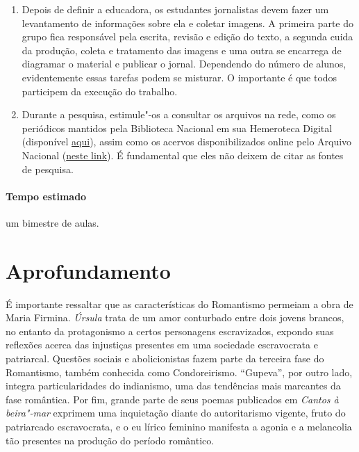 \documentclass[12pt]{extarticle}
\begin{document}
\begin{enumerate}
\item
Depois de definir a educadora, os estudantes jornalistas devem fazer
um levantamento de informações sobre ela e coletar imagens. A primeira
parte do grupo fica responsável pela escrita, revisão e edição do texto,
a segunda cuida da produção, coleta e tratamento das imagens e uma outra
se encarrega de diagramar o material e publicar o jornal. Dependendo do
número de alunos, evidentemente essas tarefas podem se misturar. O
importante é que todos participem da execução do trabalho.

\item
Durante a pesquisa, estimule"-os a consultar os arquivos na rede, como
os periódicos mantidos pela Biblioteca Nacional em sua Hemeroteca
Digital (disponível \href{https://bndigital.bn.gov.br/hemeroteca-digital/}{aqui}), assim como os acervos disponibilizados online pelo Arquivo
Nacional (\href{https://www.gov.br/arquivonacional/pt-br}{neste link}). É fundamental que eles não deixem de citar as fontes de
pesquisa.
\end{enumerate}

\paragraph{Tempo estimado} um bimestre de aulas.

\section{Aprofundamento}

É importante ressaltar que as características do Romantismo permeiam a
obra de Maria Firmina. \emph{Úrsula} trata de um amor conturbado entre
dois jovens brancos, no entanto da protagonismo a certos personagens
escravizados, expondo suas reflexões acerca das injustiças presentes em
uma sociedade escravocrata e patriarcal. Questões sociais e
abolicionistas fazem parte da terceira fase do Romantismo, também
conhecida como Condoreirismo. ``Gupeva'', por outro lado, integra
particularidades do indianismo, uma das tendências mais marcantes da
fase romântica. Por fim, grande parte de seus poemas publicados em
\emph{Cantos à beira"-mar} exprimem uma inquietação diante do
autoritarismo vigente, fruto do patriarcado escravocrata, e o eu lírico
feminino manifesta a agonia e a melancolia tão presentes na produção do
período romântico.


\end{document}
